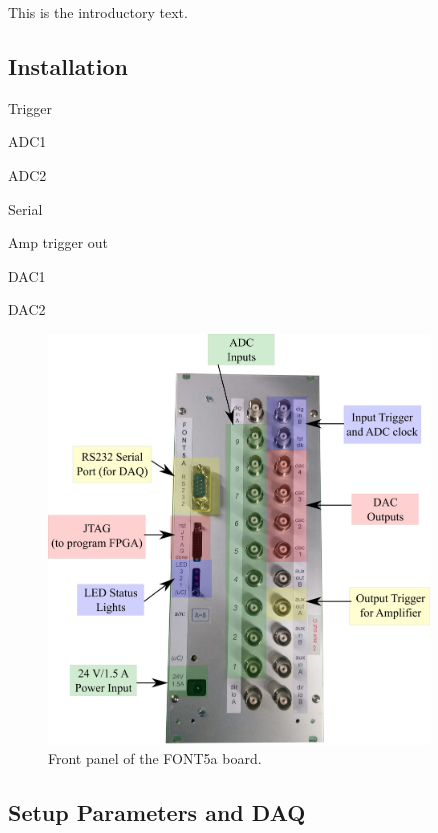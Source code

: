 
This is the introductory text.


\subsection{Installation}
\label{ss:fontInstall}


Trigger

ADC1

ADC2

Serial

Amp trigger out

DAC1

DAC2


\begin{figure}
  \centering
  \includegraphics[width=0.9\textwidth]{Figures/commissioning/FONT5aPanelPic}
  \caption{Front panel of the FONT5a board.}
  \label{f:FONT5aPanelPic}
\end{figure}


\subsection{Setup Parameters and DAQ}
\label{ss:fontDAQ}

